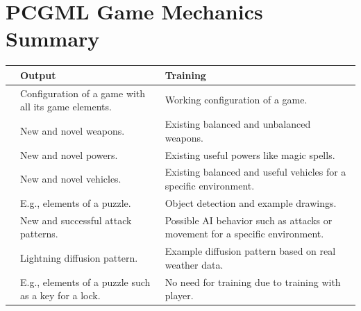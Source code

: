 \documentclass[MGS,Master,english]{twbook}%
\begin{document}
%
%
\clearpage
\appendix
\chapter{PCGML Game Mechanics Summary} \label{gameMechanicIdeaSummary}
\begin{longtable}[c]{p{4cm}|p{5.5cm}|p{5.5cm}|}
	\cline{2-3}
	                               & \textbf{Output}                                               & \textbf{Training}                                                                              \\ \hline

	\endhead
		\multicolumn{1}{|p{4cm}|}{\textbf{\nameref{idea::rulesAndBehavior}}}       & Configuration of a game with all its game elements.  & Working configuration of a game.                                                      \\ \hline
		\multicolumn{1}{|p{4cm}|}{\textbf{\nameref{idea::changingWeapons}}}        & New and novel weapons.                               & Existing balanced and unbalanced weapons.                                             \\ \hline
		\multicolumn{1}{|p{4cm}|}{\textbf{\nameref{idea::changingPowers}} }        & New and novel powers.                                & Existing useful powers like magic spells.                                             \\ \hline
		\multicolumn{1}{|p{4cm}|}{\textbf{\nameref{idea::novelCars}}     }         & New and novel vehicles.                              & Existing balanced and useful vehicles for a specific environment.                     \\ \hline
		\multicolumn{1}{|p{4cm}|}{\textbf{\nameref{idea::solverWeapon}}}           & E.g., elements of a puzzle.                          & Object detection and example drawings.                                                \\ \hline
		\multicolumn{1}{|p{4cm}|}{\textbf{\nameref{idea::defeatTheEnemy}} }        & New and successful attack patterns.                  & Possible AI behavior such as attacks or movement for a specific environment.          \\ \hline
		\multicolumn{1}{|p{4cm}|}{\textbf{\nameref{idea::caughtInAThunderstorm}}}  & Lightning diffusion pattern.                         & Example diffusion pattern based on real weather data.                                 \\ \hline
		\multicolumn{1}{|p{4cm}|}{\textbf{\nameref{idea::trainToProgress}} }       & E.g., elements of a puzzle such as a key for a lock. & No need for training due to training with player.                                     \\ \hline

\end{longtable}
\end{document}
